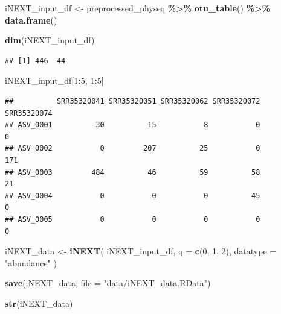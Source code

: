 \documentclass[
]{article}
\newenvironment{Shaded}{\begin{snugshade}}{\end{snugshade}}
\newcommand{\AttributeTok}[1]{\textcolor[rgb]{0.13,0.29,0.53}{#1}}
\newcommand{\DecValTok}[1]{\textcolor[rgb]{0.00,0.00,0.81}{#1}}
\newcommand{\FunctionTok}[1]{\textcolor[rgb]{0.13,0.29,0.53}{\textbf{#1}}}
\newcommand{\NormalTok}[1]{#1}
\newcommand{\OtherTok}[1]{\textcolor[rgb]{0.56,0.35,0.01}{#1}}
\newcommand{\SpecialCharTok}[1]{\textcolor[rgb]{0.81,0.36,0.00}{\textbf{#1}}}
\newcommand{\StringTok}[1]{\textcolor[rgb]{0.31,0.60,0.02}{#1}}
\begin{document}
\begin{Shaded}
\begin{Highlighting}[]
\NormalTok{iNEXT\_input\_df }\OtherTok{\textless{}{-}} 
\NormalTok{  preprocessed\_physeq }\SpecialCharTok{\%\textgreater{}\%}
  \FunctionTok{otu\_table}\NormalTok{() }\SpecialCharTok{\%\textgreater{}\%}
  \FunctionTok{data.frame}\NormalTok{()}

\FunctionTok{dim}\NormalTok{(iNEXT\_input\_df)}
\end{Highlighting}
\end{Shaded}

\begin{verbatim}
## [1] 446  44
\end{verbatim}

\begin{Shaded}
\begin{Highlighting}[]
\NormalTok{iNEXT\_input\_df[}\DecValTok{1}\SpecialCharTok{:}\DecValTok{5}\NormalTok{, }\DecValTok{1}\SpecialCharTok{:}\DecValTok{5}\NormalTok{]}
\end{Highlighting}
\end{Shaded}

\begin{verbatim}
##          SRR35320041 SRR35320051 SRR35320062 SRR35320072 SRR35320074
## ASV_0001          30          15           8           0           0
## ASV_0002           0         207          25           0         171
## ASV_0003         484          46          59          58          21
## ASV_0004           0           0           0          45           0
## ASV_0005           0           0           0           0           0
\end{verbatim}

\begin{Shaded}
\begin{Highlighting}[]
\NormalTok{iNEXT\_data }\OtherTok{\textless{}{-}} \FunctionTok{iNEXT}\NormalTok{(}
\NormalTok{  iNEXT\_input\_df,}
  \AttributeTok{q =} \FunctionTok{c}\NormalTok{(}\DecValTok{0}\NormalTok{, }\DecValTok{1}\NormalTok{, }\DecValTok{2}\NormalTok{),}
  \AttributeTok{datatype =} \StringTok{"abundance"}
\NormalTok{)}


\FunctionTok{save}\NormalTok{(iNEXT\_data, }\AttributeTok{file =} \StringTok{"data/iNEXT\_data.RData"}\NormalTok{)}
\end{Highlighting}
\end{Shaded}

\begin{Shaded}
\begin{Highlighting}[]
\FunctionTok{str}\NormalTok{(iNEXT\_data)}
\end{Highlighting}
\end{Shaded}
\end{document}
